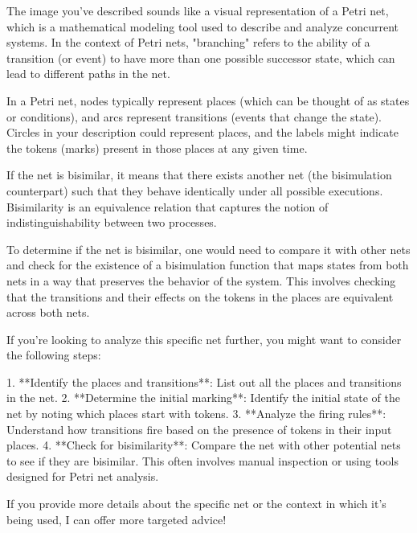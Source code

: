 The image you've described sounds like a visual representation of a Petri net, which is a mathematical modeling tool used to describe and analyze concurrent systems. In the context of Petri nets, "branching" refers to the ability of a transition (or event) to have more than one possible successor state, which can lead to different paths in the net.

In a Petri net, nodes typically represent places (which can be thought of as states or conditions), and arcs represent transitions (events that change the state). Circles in your description could represent places, and the labels might indicate the tokens (marks) present in those places at any given time.

If the net is bisimilar, it means that there exists another net (the bisimulation counterpart) such that they behave identically under all possible executions. Bisimilarity is an equivalence relation that captures the notion of indistinguishability between two processes.

To determine if the net is bisimilar, one would need to compare it with other nets and check for the existence of a bisimulation function that maps states from both nets in a way that preserves the behavior of the system. This involves checking that the transitions and their effects on the tokens in the places are equivalent across both nets.

If you're looking to analyze this specific net further, you might want to consider the following steps:

1. **Identify the places and transitions**: List out all the places and transitions in the net.
2. **Determine the initial marking**: Identify the initial state of the net by noting which places start with tokens.
3. **Analyze the firing rules**: Understand how transitions fire based on the presence of tokens in their input places.
4. **Check for bisimilarity**: Compare the net with other potential nets to see if they are bisimilar. This often involves manual inspection or using tools designed for Petri net analysis.

If you provide more details about the specific net or the context in which it's being used, I can offer more targeted advice!